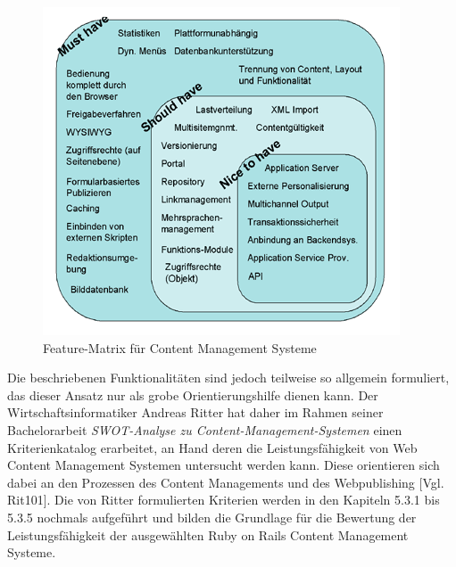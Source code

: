 \begin{figure}[!h]
\begin{center}
\includegraphics[scale=0.3]{images/analyse/wcmfeaturematrix.png}
\caption{Feature-Matrix für Content Management Systeme}
\label{featurematrix}
\end{center}
\end{figure}


Die beschriebenen Funktionalitäten sind jedoch teilweise so allgemein formuliert, das dieser Ansatz nur als grobe Orientierungshilfe dienen kann.
Der Wirtschaftsinformatiker Andreas Ritter hat daher im Rahmen seiner Bachelorarbeit \emph{SWOT-Analyse zu Content-Management-Systemen} einen Kriterienkatalog erarbeitet, an Hand deren die Leistungsfähigkeit von Web Content Management Systemen untersucht werden kann. Diese orientieren sich dabei an den Prozessen des Content Managements und des Webpublishing [Vgl. Rit101].
\newline
\newline
Die von Ritter formulierten Kriterien werden in den Kapiteln 5.3.1 bis 5.3.5 nochmals aufgeführt und bilden die Grundlage für die Bewertung der Leistungsfähigkeit der ausgewählten Ruby on Rails Content Management Systeme.

